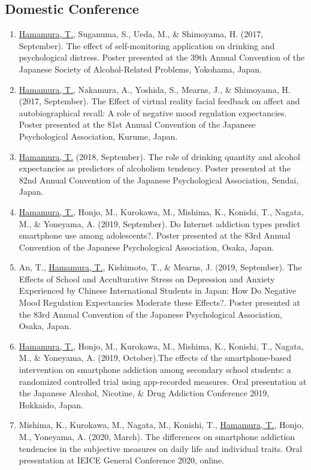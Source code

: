 \documentclass[a4paper]{article}
\begin{document}
\subsection{Domestic Conference}
\begin{enumerate}
	\item \underline{Hamamura, T.}, Suganuma, S., Ueda, M., \& Shimoyama, H. (2017, September). The effect of self-monitoring application on drinking and psychological distress. Poster presented at the 39th Annual Convention of the Japanese Society of Alcohol-Related Problems, Yokohama, Japan.
	\item \underline{Hamamura, T.}, Nakamura, A., Yoshida, S., Mearns, J., \& Shimoyama, H. (2017, September). The Effect of virtual reality facial feedback on affect and autobiographical recall: A role of negative mood regulation expectancies. Poster presented at the 81st Annual Convention of the Japanese Psychological Association, Kurume, Japan.
	\item \underline{Hamamura, T.} (2018, September). The role of drinking quantity and alcohol expectancies as predictors of alcoholism tendency. Poster presented at the 82nd Annual Convention of the Japanese Psychological Association, Sendai, Japan.
	\item \underline{Hamamura, T.}, Honjo, M., Kurokawa, M., Mishima, K., Konishi, T., Nagata, M., \& Yoneyama, A. (2019, September). Do Internet addiction types predict smartphone use among adolescents?. Poster presented at the 83rd Annual Convention of the Japanese Psychological Association, Osaka, Japan.
	\item An, T., \underline{Hamamura, T.}, Kishimoto, T., \& Mearns, J. (2019, September). The Effects of School and Acculturative Stress on Depression and Anxiety Experienced by Chinese International Students in Japan: How Do Negative Mood Regulation Expectancies Moderate these Effects?. Poster presented at the 83rd Annual Convention of the Japanese Psychological Association, Osaka, Japan.
	\item \underline{Hamamura, T.}, Honjo, M., Kurokawa, M., Mishima, K., Konishi, T., Nagata, M., \& Yoneyama, A. (2019, October).The effects of the smartphone-based intervention on smartphone addiction among secondary school students: a randomized controlled trial using app-recorded measures. Oral presentation at the Japanese Alcohol, Nicotine, \& Drug Addiction Conference 2019, Hokkaido, Japan.
	\item Mishima, K., Kurokawa, M., Nagata, M., Konishi, T., \underline{Hamamura, T.}, Honjo, M., Yoneyama, A. (2020, March). The differences on smartphone addiction tendencies in the subjective measures on daily life and individual traits. Oral presentation at IEICE General Conference 2020, online.

\end{enumerate}
\end{document}
